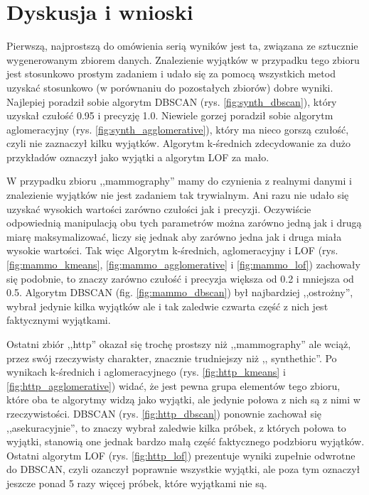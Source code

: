 \documentclass{classrep}
\begin{document}
    \section{Dyskusja i wnioski} {
        Pierwszą, najprostszą do omówienia serią wyników jest ta, związana ze sztucznie
        wygenerowanym zbiorem danych. Znalezienie wyjątków w przypadku tego zbioru jest
        stosunkowo prostym zadaniem i udało się za pomocą wszystkich metod uzyskać
        stosunkowo (w porównaniu do pozostałych zbiorów) dobre wyniki. Najlepiej
        poradził sobie algorytm DBSCAN (rys. \ref{fig:synth_dbscan}), który uzyskał
        czułość 0.95 i precyzję 1.0. Niewiele gorzej poradził sobie algorytm
        aglomeracyjny (rys. \ref{fig:synth_agglomerative}), który ma nieco gorszą
        czułość, czyli nie zaznaczył kilku wyjątków. Algorytm k-średnich zdecydowanie
        za dużo przykładów oznaczył jako wyjątki a algorytm LOF za mało.

        W przypadku zbioru ,,mammography'' mamy do czynienia z realnymi danymi i
        znalezienie wyjątków nie jest zadaniem tak trywialnym. Ani razu nie udało się
        uzyskać wysokich wartości zarówno czułości jak i precyzji. Oczywiście
        odpowiednią manipulacją obu tych parametrów można zarówno jedną jak i drugą
        miarę maksymalizować, liczy się jednak aby zarówno jedna jak i druga miała
        wysokie wartości. Tak więc Algorytm k-średnich, aglomeracyjny i LOF (rys.
        \ref{fig:mammo_kmeans}, \ref{fig:mammo_agglomerative} i \ref{fig:mammo_lof})
        zachowały się podobnie, to znaczy zarówno czułość i precyzja większa od 0.2 i
        mniejsza od 0.5. Algorytm DBSCAN (fig. \ref{fig:mammo_dbscan}) był najbardziej
        ,,ostrożny'', wybrał jedynie kilka wyjątków ale i tak zaledwie czwarta część z
        nich jest faktycznymi wyjątkami.

        Ostatni zbiór ,,http'' okazał się trochę prostszy niż ,,mammography'' ale
        wciąż, przez swój rzeczywisty charakter, znacznie trudniejszy niż ,,
        synthethic''. Po wynikach k-średnich i aglomeracyjnego (rys.
        \ref{fig:http_kmeans} i \ref{fig:http_agglomerative}) widać, że jest pewna
        grupa elementów tego zbioru, które oba te algorytmy widzą jako wyjątki, ale
        jedynie połowa z nich są z nimi w rzeczywistości. DBSCAN (rys.
        \ref{fig:http_dbscan}) ponownie zachował się ,,asekuracyjnie'', to znaczy
        wybrał zaledwie kilka próbek, z których połowa to wyjątki, stanowią one jednak
        bardzo małą część faktycznego podzbioru wyjątków. Ostatni algorytm LOF (rys.
        \ref{fig:http_lof}) prezentuje wyniki zupełnie odwrotne do DBSCAN, czyli
        ozanczył poprawnie wszystkie wyjątki, ale poza tym oznaczył jeszcze ponad 5
        razy więcej próbek, które wyjątkami nie są.

}
\end{document}
